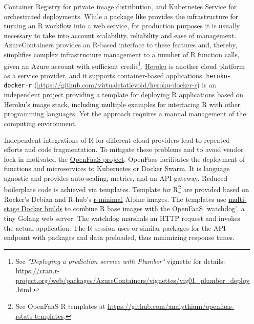 \href{https://azure.microsoft.com/en-us/services/container-registry/}{Container
Registry} for private image distribution, and
\href{https://azure.microsoft.com/en-us/services/kubernetes-service/}{Kubernetes
Service} for orchestrated deployments. While a package like
 provides the infrastructure for turning an R workflow
into a web service, for production purposes it is usually necessary to
take into account scalability, reliability and ease of management.
AzureContainers provides an R-based interface to these features and,
thereby, simplifies complex infrastructure management to a number of R
function calls, given an Azure account with sufficient
credit\footnote{See \emph{"Deploying a prediction service with Plumber"} vignette for details:  \href{https://cran.r-project.org/web/packages/AzureContainers/vignettes/vig01_plumber_deploy.html}{https://cran.r-project.org/web/packages/AzureContainers/vignettes/vig01\_plumber\_deploy.html}.}.
\href{https://www.heroku.com/}{Heroku} is another cloud platform as a
service provider, and it supports container-based applications.
\texttt{heroku-docker-r}
(\url{https://github.com/virtualstaticvoid/heroku-docker-r}) is an
independent project providing a template for deploying R applications
based on Heroku's image stack, including multiple examples for
interfacing R with other programming languages. Yet the approach
requires a manual management of the computing environment.

Independent integrations of R for different cloud providers lead to
repeated efforts and code fragmentation. To mitigate these problems and
to avoid vendor lock-in motivated the
\href{https://www.openfaas.com/}{OpenFaaS project}. OpenFaas facilitates
the deployment of functions and microservices to Kubernetes or Docker
Swarm. It is language agnostic and provides auto-scaling, metrics, and
an API gateway. Reduced boilerplate code is achieved via templates.
Template for
R\footnote{See OpenFaaS R templates at \href{https://github.com/analythium/openfaas-rstats-templates}{https://github.com/analythium/openfaas-rstats-templates}.}
are provided based on Rocker's Debian and R-hub's
\href{https://github.com/r-hub/r-minimal}{r-minimal} Alpine images. The
templates use
\href{https://docs.docker.com/develop/develop-images/multistage-build/}{multi-stage
Docker builds} to combine R base images with the OpenFaaS `watchdog', a
tiny Golang web server. The watchdog marshals an HTTP request and
invokes the actual application. The R session uses  or
similar packages for the API endpoint with packages and data preloaded,
thus minimizing response times.

